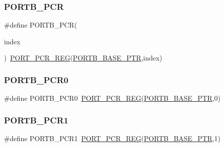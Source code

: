 \subsubsection{\texorpdfstring{P\+O\+R\+T\+B\+\_\+\+P\+CR}{PORTB\_PCR}}
{\footnotesize\ttfamily \#define P\+O\+R\+T\+B\+\_\+\+P\+CR(\begin{DoxyParamCaption}\item[{}]{index }\end{DoxyParamCaption})~\hyperlink{group___p_o_r_t___register___accessor___macros_ga7a4a549c0ffd6b98b9fbfc0bdcfb5cea}{P\+O\+R\+T\+\_\+\+P\+C\+R\+\_\+\+R\+EG}(\hyperlink{group___p_o_r_t___peripheral_ga585b4782d1ceb44492289af0019480f9}{P\+O\+R\+T\+B\+\_\+\+B\+A\+S\+E\+\_\+\+P\+TR},index)}

\mbox{\label{group___p_o_r_t___register___accessor___macros_ga86b17a376709adcb769bce67f2caaf3e}} 
\subsubsection{\texorpdfstring{P\+O\+R\+T\+B\+\_\+\+P\+C\+R0}{PORTB\_PCR0}}
{\footnotesize\ttfamily \#define P\+O\+R\+T\+B\+\_\+\+P\+C\+R0~\hyperlink{group___p_o_r_t___register___accessor___macros_ga7a4a549c0ffd6b98b9fbfc0bdcfb5cea}{P\+O\+R\+T\+\_\+\+P\+C\+R\+\_\+\+R\+EG}(\hyperlink{group___p_o_r_t___peripheral_ga585b4782d1ceb44492289af0019480f9}{P\+O\+R\+T\+B\+\_\+\+B\+A\+S\+E\+\_\+\+P\+TR},0)}

\mbox{\label{group___p_o_r_t___register___accessor___macros_ga7d6639d3c2bf018ceb6ff89305f07ef9}} 
\subsubsection{\texorpdfstring{P\+O\+R\+T\+B\+\_\+\+P\+C\+R1}{PORTB\_PCR1}}
{\footnotesize\ttfamily \#define P\+O\+R\+T\+B\+\_\+\+P\+C\+R1~\hyperlink{group___p_o_r_t___register___accessor___macros_ga7a4a549c0ffd6b98b9fbfc0bdcfb5cea}{P\+O\+R\+T\+\_\+\+P\+C\+R\+\_\+\+R\+EG}(\hyperlink{group___p_o_r_t___peripheral_ga585b4782d1ceb44492289af0019480f9}{P\+O\+R\+T\+B\+\_\+\+B\+A\+S\+E\+\_\+\+P\+TR},1)}

